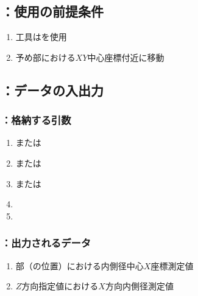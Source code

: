 \subsection{\MXIWidth：使用の前提条件}
\begin{enumerate}[label*=\sarrow]
\item 工具は\TouchSensorProbe を使用
\item 予め\EndFace 部における$XY$中心座標付近に移動
\end{enumerate}


\subsection{\MXIWidth：データの入出力}

\subsubsection{\MXIWidth：格納する引数}
\begin{enumerate}[label*=\sarrow]
\item \PMTopEndACID または\PMBottomEndACID
\item \PMTopReAlocationLength または\PMBottomReAlocationLength
\item \PMTopAlocationLength または\PMBottomAlocationLength
\item \PMCenterCurvatureRadius
\item \PMPlatingThk
\end{enumerate}

\subsubsection{\MXIWidth：出力されるデータ}
\begin{enumerate}[label*=\sarrow]
\item \EndFace 部（\ReAlocationLength の位置）における内側径中心$X$座標測定値
\item $Z$方向指定値における$X$方向内側径測定値
\end{enumerate}

